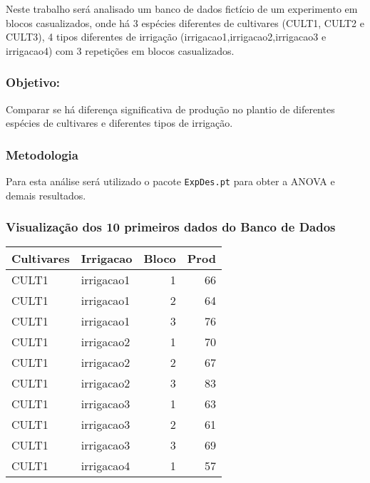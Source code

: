 \documentclass[
]{article}
\begin{document}
Neste trabalho será analisado um banco de dados fictício de um
experimento em blocos casualizados, onde há 3 espécies diferentes de
cultivares (CULT1, CULT2 e CULT3), 4 tipos diferentes de irrigação
(irrigacao1,irrigacao2,irrigacao3 e irrigacao4) com 3 repetições em
blocos casualizados.

\hypertarget{objetivo}{%
\subsubsection{Objetivo:}\label{objetivo}}

Comparar se há diferença significativa de produção no plantio de
diferentes espécies de cultivares e diferentes tipos de irrigação.

\hypertarget{metodologia}{%
\subsubsection{Metodologia}\label{metodologia}}

Para esta análise será utilizado o pacote \texttt{ExpDes.pt} para obter
a ANOVA e demais resultados.

\hypertarget{visualizauxe7uxe3o-dos-10-primeiros-dados-do-banco-de-dados}{%
\subsubsection{Visualização dos 10 primeiros dados do Banco de
Dados}\label{visualizauxe7uxe3o-dos-10-primeiros-dados-do-banco-de-dados}}

\begin{longtable}[]{@{}llrr@{}}
\toprule
Cultivares & Irrigacao & Bloco & Prod \\
\midrule
\endhead
CULT1 & irrigacao1 & 1 & 66 \\
CULT1 & irrigacao1 & 2 & 64 \\
CULT1 & irrigacao1 & 3 & 76 \\
CULT1 & irrigacao2 & 1 & 70 \\
CULT1 & irrigacao2 & 2 & 67 \\
CULT1 & irrigacao2 & 3 & 83 \\
CULT1 & irrigacao3 & 1 & 63 \\
CULT1 & irrigacao3 & 2 & 61 \\
CULT1 & irrigacao3 & 3 & 69 \\
CULT1 & irrigacao4 & 1 & 57 \\
\bottomrule
\end{longtable}
\end{document}
